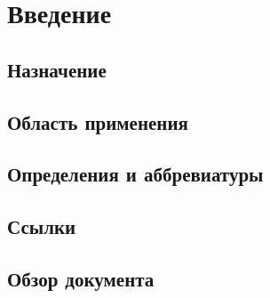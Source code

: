 \chapter{Введение}

\section{Назначение}


\section{Область применения}


\section{Определения и аббревиатуры}


\section{Ссылки}


\section{Обзор документа}
